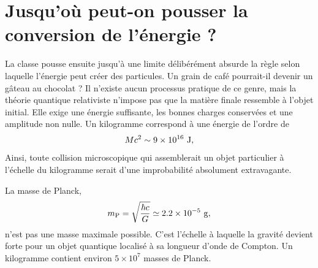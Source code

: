 \begin{classroomqa}
\end{classroomqa}

\begin{classroomqa}
\end{classroomqa}

\section{Jusqu’où peut-on pousser la conversion de l’énergie ?}

La classe pousse ensuite jusqu’à une limite délibérément absurde la règle selon laquelle l’énergie peut créer des particules. Un grain de café pourrait-il devenir un gâteau au chocolat ? Il n’existe aucun processus pratique de ce genre, mais la théorie quantique relativiste n’impose pas que la matière finale ressemble à l’objet initial. Elle exige une énergie suffisante, les bonnes charges conservées et une amplitude non nulle. Un kilogramme correspond à une énergie de l’ordre de
\begin{equation}
  Mc^2\sim9\times10^{16}\ {\rm J},
\end{equation}
Ainsi, toute collision microscopique qui assemblerait un objet particulier à l’échelle du kilogramme serait d’une improbabilité absolument extravagante.

La masse de Planck,
\begin{equation}
  m_{\rm P}=\sqrt{\frac{\hbar c}{G}}
  \simeq2.2\times10^{-5}\ {\rm g},
\end{equation}
n’est pas une masse maximale possible. C’est l’échelle à laquelle la gravité devient forte pour un objet quantique localisé à sa longueur d’onde de Compton. Un kilogramme contient environ \(5\times10^7\) masses de Planck.

